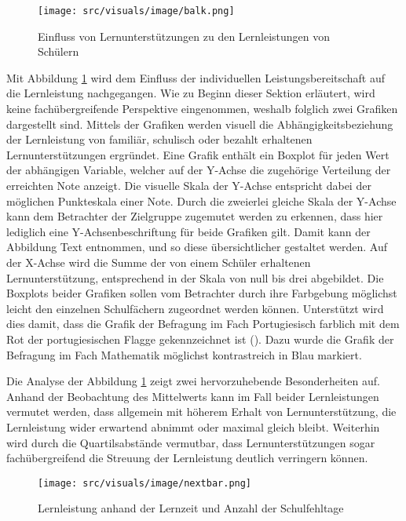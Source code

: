 \begin{figure}[htb]
    \centering
    \texttt{[image: src/visuals/image/balk.png]}
    \caption{Einfluss von Lernunterstützungen zu den Lernleistungen von Schülern}
    \label{fig:balk}
\end{figure}

Mit Abbildung \ref{fig:balk} wird dem Einfluss der individuellen Leistungsbereitschaft auf die Lernleistung nachgegangen.
Wie zu Beginn dieser Sektion erläutert, wird keine fachübergreifende Perspektive eingenommen, weshalb folglich zwei Grafiken dargestellt sind.
Mittels der Grafiken werden visuell die Abhängigkeitsbeziehung der Lernleistung von familiär, schulisch oder bezahlt erhaltenen Lernunterstützungen ergründet.
Eine Grafik enthält ein Boxplot für jeden Wert der abhängigen Variable, welcher auf der Y-Achse die zugehörige Verteilung der erreichten Note anzeigt.
Die visuelle Skala der Y-Achse entspricht dabei der möglichen Punkteskala einer Note.
Durch die zweierlei gleiche Skala der Y-Achse kann dem Betrachter der Zielgruppe zugemutet werden zu erkennen, dass hier lediglich eine Y-Achsenbeschriftung für beide Grafiken gilt.
Damit kann der Abbildung Text entnommen, und so diese übersichtlicher gestaltet werden.
Auf der X-Achse wird die Summe der von einem Schüler erhaltenen Lernunterstützung, entsprechend in der Skala von null bis drei abgebildet.
Die Boxplots beider Grafiken sollen vom Betrachter durch ihre Farbgebung möglichst leicht den einzelnen Schulfächern zugeordnet werden können.
Unterstützt wird dies damit, dass die Grafik der Befragung im Fach Portugiesisch farblich mit dem Rot der portugiesischen Flagge gekennzeichnet ist (\cite[]{Wikipedia.2024}).
Dazu wurde die Grafik der Befragung im Fach Mathematik möglichst kontrastreich in Blau markiert.

Die Analyse der Abbildung \ref{fig:balk} zeigt zwei hervorzuhebende Besonderheiten auf.
Anhand der Beobachtung des Mittelwerts kann im Fall beider Lernleistungen vermutet werden, dass allgemein mit höherem Erhalt von Lernunterstützung, die Lernleistung wider erwartend abnimmt oder maximal gleich bleibt.
Weiterhin wird durch die Quartilsabstände vermutbar, dass Lernunterstützungen sogar fachübergreifend die Streuung der Lernleistung deutlich verringern können.

\begin{figure}[htb]
    \centering
    \texttt{[image: src/visuals/image/nextbar.png]}
    \caption{Lernleistung anhand der Lernzeit und Anzahl der Schulfehltage}
    \label{fig:nextbar}
\end{figure}

